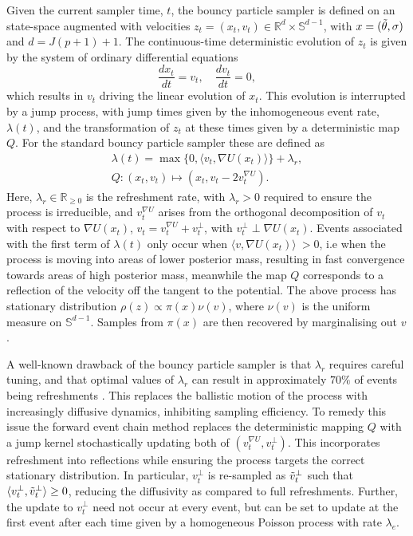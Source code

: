 \documentclass[ba,preprint]{imsart}
\theoremstyle{plain}
\theoremstyle{definition}
\theoremstyle{remark}
\begin{document}
Given the current sampler time, $t$, the bouncy particle sampler is defined on an state-space augmented with velocities $z_t = (x_t, v_t) \in \mathbb{R}^d\times\mathbb{S}^{d-1}$, with $x = (\Tilde{\theta}, \sigma)$ and $d = J(p+1) + 1$. The continuous-time deterministic evolution of $z_t$ is given by the system of ordinary differential equations
\begin{equation*}
    \frac{dx_t}{dt} = v_t, \quad \frac{dv_t}{dt} = 0,
\end{equation*}
which results in $v_t$ driving the linear evolution of $x_t$. This evolution is interrupted by a jump process, with jump times given by the inhomogeneous event rate, $\lambda(t)$, and the transformation of $z_t$ at these times given by a  deterministic map $Q$. For the standard bouncy particle sampler these are defined as
\begin{gather*}
    \lambda(t) = \max\{0, \langle v_t, \nabla U(x_t)\rangle\} + \lambda_r, \\
    Q: (x_t, v_t) \mapsto (x_t, v_t - 2v_t^{\nabla U}).
\end{gather*}
Here, $\lambda_r \in \mathbb{R}_{\geq 0}$ is the refreshment rate, with $\lambda_r > 0$ required to ensure the process is irreducible, and $v_t^{\nabla U}$ arises from the orthogonal decomposition of $v_t$ with respect to $\nabla U(x_t)$, $v_t = v_t^{\nabla U} + v_t^{\perp}$, with $v_t^{\perp} \perp \nabla U(x_t)$. Events associated with the first term of $\lambda(t)$ only occur when $\langle v, \nabla U(x_t)\rangle\ > 0$, i.e when the process is moving into areas of lower posterior mass, resulting in fast convergence towards areas of high posterior mass, meanwhile the map $Q$ corresponds to a reflection of the velocity off the tangent to the potential. The above process has stationary distribution $\rho(z) \propto \pi(x)\nu(v)$, where $\nu(v)$ is the uniform measure on $\mathbb{S}^{d-1}$. Samples from $\pi(x)$ are then recovered by marginalising out $v$.

A well-known drawback of the bouncy particle sampler is that $\lambda_r$ requires careful tuning, and that optimal values of $\lambda_r$ can result in approximately $70\%$ of events being refreshments \citep{Bertazzi2022}. This replaces the ballistic motion of the process with increasingly diffusive dynamics, inhibiting sampling efficiency. To remedy this issue the forward event chain method \citep{Michel2020} replaces the deterministic mapping $Q$ with a jump kernel stochastically updating both of $(v_t^{\nabla U}, v_t^{\perp})$. This incorporates refreshment into reflections while ensuring the process targets the correct stationary distribution. In particular, $v_t^{\perp}$ is re-sampled as $\Tilde{v}_t^{\perp}$ such that $\langle v_t^{\perp}, \Tilde{v}_t^{\perp} \rangle \geq 0$, reducing the diffusivity as compared to full refreshments. Further, the update to $v_t^{\perp}$ need not occur at every event, but can be set to update at the first event after each time given by a homogeneous Poisson process with rate $\lambda_e$. 
\end{document}
